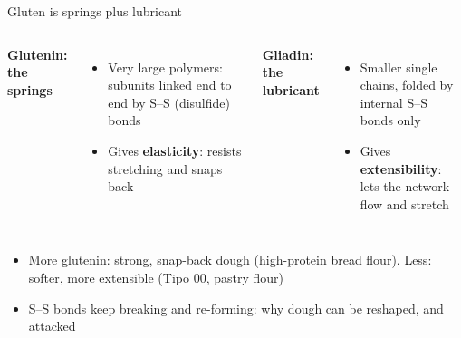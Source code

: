 \documentclass[aspectratio=169,11pt]{beamer}
\begin{document}
\begin{frame}{Gluten is springs plus lubricant}
  \begin{columns}[T]
      {\color{crust}\textbf{Glutenin: the springs}}
      \begin{itemize}
        \item Very large polymers: subunits linked end to end by S–S (disulfide) bonds
        \item Gives \textbf{elasticity}: resists stretching and snaps back
      \end{itemize}
      {\color{crust}\textbf{Gliadin: the lubricant}}
      \begin{itemize}
        \item Smaller single chains, folded by internal S–S bonds only
        \item Gives \textbf{extensibility}: lets the network flow and stretch
      \end{itemize}
  \end{columns}
  \smallskip
  \begin{itemize}
    \item More glutenin: strong, snap-back dough (high-protein bread flour).
      Less: softer, more extensible (Tipo 00, pastry flour)
    \item S–S bonds keep breaking and re-forming: why dough can be reshaped, and attacked
  \end{itemize}
\end{frame}
\end{document}

